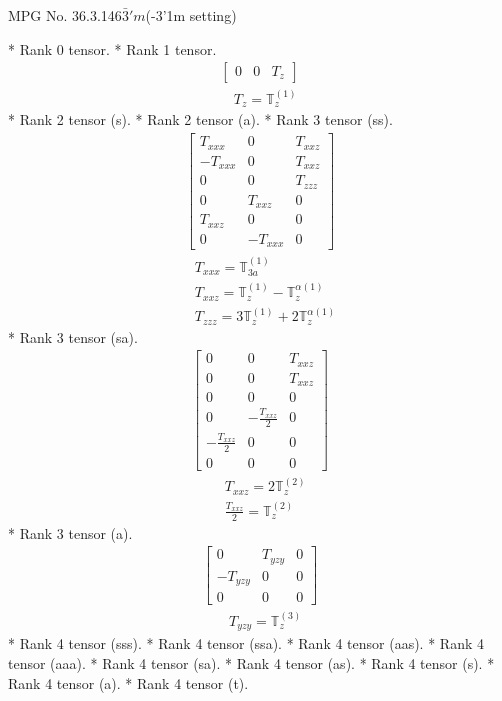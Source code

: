\documentclass[fleqn,8pt,landscape]{jsarticle}
\begin{document}
\setcounter{MaxMatrixCols}{32}

\renewcommand{\tablename}{Table~}
\renewcommand{\figurename}{Figure~}
\begin{center}
\LARGE
MPG No. 36.3.146\quad$\bar{3}'m$\quad(-3'1m setting)
\end{center}
* Rank 0 tensor.
* Rank 1 tensor.
\begin{align*}
\begin{bmatrix} 0 & 0 & T_{z} \end{bmatrix}
\end{align*}
\begin{align*}
& T_{z} = \mathbb{T}_{z}^{(1)}
\end{align*}
* Rank 2 tensor (s).
* Rank 2 tensor (a).
* Rank 3 tensor (ss).
\begin{align*}
\begin{bmatrix} T_{xxx} & 0 & T_{xxz} \\ - T_{xxx} & 0 & T_{xxz} \\ 0 & 0 & T_{zzz} \\ 0 & T_{xxz} & 0 \\ T_{xxz} & 0 & 0 \\ 0 & - T_{xxx} & 0 \end{bmatrix}
\end{align*}
\begin{align*}
& T_{xxx} = \mathbb{T}_{3a}^{(1)} \\
& T_{xxz} = \mathbb{T}_{z}^{(1)} - \mathbb{T}_{z}^{\alpha(1)} \\
& T_{zzz} = 3 \mathbb{T}_{z}^{(1)} + 2 \mathbb{T}_{z}^{\alpha(1)}
\end{align*}
* Rank 3 tensor (sa).
\begin{align*}
\begin{bmatrix} 0 & 0 & T_{xxz} \\ 0 & 0 & T_{xxz} \\ 0 & 0 & 0 \\ 0 & - \frac{T_{xxz}}{2} & 0 \\ - \frac{T_{xxz}}{2} & 0 & 0 \\ 0 & 0 & 0 \end{bmatrix}
\end{align*}
\begin{align*}
& T_{xxz} = 2 \mathbb{T}_{z}^{(2)} \\
& \frac{T_{xxz}}{2} = \mathbb{T}_{z}^{(2)}
\end{align*}
* Rank 3 tensor (a).
\begin{align*}
\begin{bmatrix} 0 & T_{yzy} & 0 \\ - T_{yzy} & 0 & 0 \\ 0 & 0 & 0 \end{bmatrix}
\end{align*}
\begin{align*}
& T_{yzy} = \mathbb{T}_{z}^{(3)}
\end{align*}
* Rank 4 tensor (sss).
* Rank 4 tensor (ssa).
* Rank 4 tensor (aas).
* Rank 4 tensor (aaa).
* Rank 4 tensor (sa).
* Rank 4 tensor (as).
* Rank 4 tensor (s).
* Rank 4 tensor (a).
* Rank 4 tensor (t).
\end{document}
